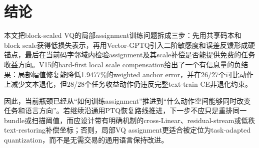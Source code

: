 \section{结论}

本文把block-scaled VQ的局部assignment训练问题拆成三步：先用共享码本和block scale获得低损失表示，再用Vector-GPTQ引入二阶敏感度和误差反馈形成硬锚点，最后在当前码字邻域内检验assignment及其scale补偿是否能提供免费的任务收益方向。V15的hard-first local scale compensation给出了一个有信息量的负结果：局部幅值修复能降低1.9477\%的weighted anchor error，并在26/27个可比动作上减少文本退化，但28/28个任务收益动作仍违反完整text-train CE非退化约束。

因此，当前瓶颈已经从“如何训练assignment”推进到“什么动作空间能够同时改变任务和语言方向”。若继续沿通用PTQ恢复路线推进，下一步不应只是重排同一bundle或扫描阈值，而应设计带有明确机制的cross-Linear、residual-stream或低秩text-restoring补偿坐标；否则，局部VQ assignment更适合被定位为task-adapted quantization，而不是无需交易的通用语言保持改进。
